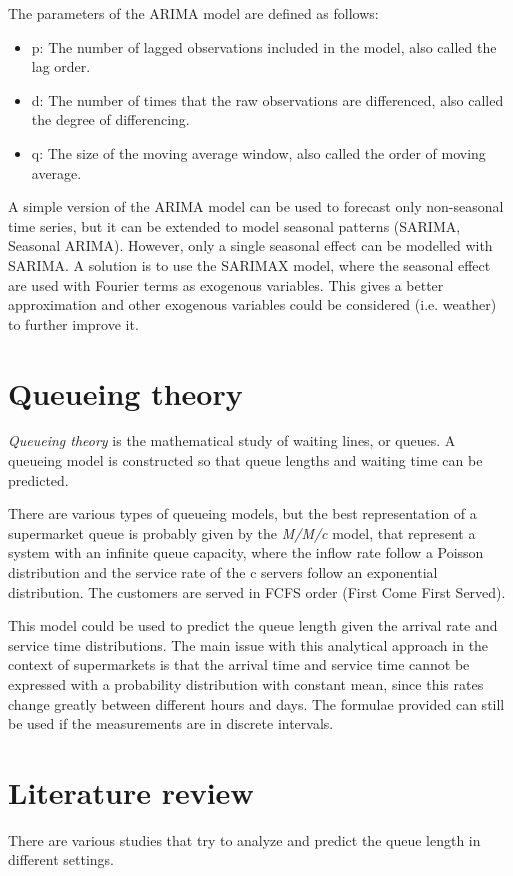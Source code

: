 The parameters of the ARIMA model are defined as follows:
\begin{itemize}
  \item p: The number of lagged observations included in the model, also called the lag order.
  \item d: The number of times that the raw observations are differenced, also called the degree of differencing.
  \item q: The size of the moving average window, also called the order of moving average.
\end{itemize}

A simple version of the ARIMA model can be used to forecast only non-seasonal time series, but it can be extended to model seasonal patterns (SARIMA, Seasonal ARIMA). However, only a single seasonal effect can be modelled with SARIMA. A solution is to use the SARIMAX model, where the seasonal effect are used with Fourier terms as exogenous variables. This gives a better approximation and other exogenous variables could be considered (i.e. weather) to further improve it.


\section{Queueing theory}
\label{sec:queueing_theory}

\emph{Queueing theory} is the mathematical study of waiting lines, or queues. A queueing model is constructed so that queue lengths and waiting time can be predicted.

There are various types of queueing models, but the best representation of a supermarket queue is probably given by the \emph{M/M/c} model, that represent a system with an infinite queue capacity, where the inflow rate follow a Poisson distribution and the service rate of the c servers follow an exponential distribution. The customers are served in FCFS order (First Come First Served).

This model could be used to predict the queue length given the arrival rate and service time distributions.
The main issue with this analytical approach in the context of supermarkets is that the arrival time and service time cannot be expressed with a probability distribution with constant mean, since this rates change greatly between different hours and days. The formulae provided can still be used if the measurements are in discrete intervals.



\section{Literature review}
\label{sec:literature_review}

There are various studies that try to analyze and predict the queue length in different settings.

\section{}